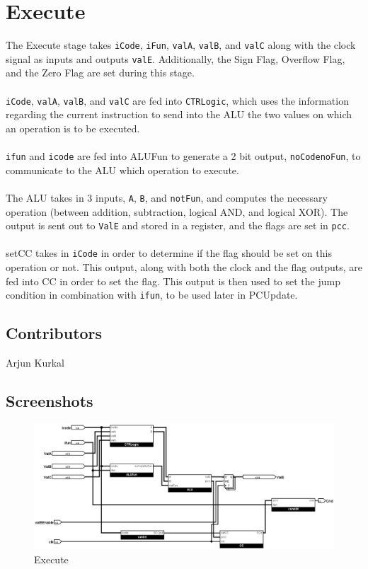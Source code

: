 \clearpage
\section*{Execute}
The Execute stage takes \verb+iCode+, \verb+iFun+, \verb+valA+, \verb+valB+, and \verb+valC+ along with the clock signal as inputs and outputs \verb+valE+. 
 Additionally, the Sign Flag, Overflow Flag, and the Zero Flag are set during this stage.\\\\
 \verb+iCode+, \verb+valA+, \verb+valB+, and \verb+valC+ are fed into \verb+CTRLogic+, which uses the information regarding the current instruction to send into the ALU the two values on which an operation is to be executed. \\\\
 \verb+ifun+ and \verb+icode+ are fed into ALUFun to generate a 2 bit output, \verb+noCodenoFun+, to communicate to the ALU which operation to execute.\\\\
 The ALU takes in 3 inputs, \verb+A+, \verb+B+, and \verb+notFun+, and computes the necessary operation (between addition, subtraction, logical AND, and logical XOR).  The output is sent out to \verb+ValE+ and stored in a register, and the flags are set in \verb+pcc+.\\\\
 setCC takes in \verb+iCode+ in order to determine if the flag should be set on this operation or not.  This output, along with both the clock and the flag outputs, are fed into CC in order to set the flag.  This output is then used to set the jump condition in combination with \verb+ifun+, to be used later in PCUpdate.
\subsection*{Contributors}
Arjun Kurkal
\clearpage
\subsection*{Screenshots}

\begin{figure}[!ht]
    \centering
    \includegraphics[width=\textwidth]{Images/Execute.png}
    \caption{Execute}
\end{figure}
